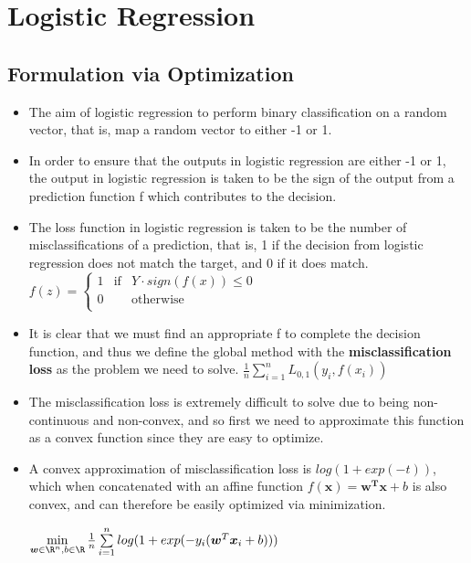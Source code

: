 \documentclass[english]{latex4ei/latex4ei_sheet}
\begin{document}
\section{Logistic Regression}
\begin{sectionbox}
\subsection{Formulation via Optimization}
\begin{itemize}
\item The aim of logistic regression to perform binary classification on a random vector, that is, map a random vector to either -1 or 1.
\item In order to ensure that the outputs in logistic regression are either -1 or 1, the output in logistic regression is taken to be the sign of the output from a prediction function f which contributes to the decision.
\item The loss function in logistic regression is taken to be the number of misclassifications of a prediction, that is, 1 if the decision from logistic regression does not match the target, and 0 if it does match.
$f(z) = \left\{ \begin{array}{rcl}
     1 & \mbox{if}
& Y\cdot sign(f(x))\leq 0 \\ 0 & & \mbox{otherwise}\\
\end{array}\right.$
\item It is clear that we must find an appropriate f  to complete the decision function, and thus we define the global method with the \textbf{misclassification loss} as the problem we need to solve.
$ \frac{1}{n}\sum\limits_{i=1}^nL_{0,1}(y_i,f(x_i))$
\item The misclassification loss is extremely difficult to solve due to being non-continuous and non-convex, and so first we need to approximate this function as a convex function since they are easy to optimize.
\item A convex approximation of misclassification loss is $log(1 + exp(-t))$, which when concatenated with  an affine function $f(\boldsymbol{x})=\boldsymbol{w^Tx}+b$ is also convex, and can therefore be easily optimized via minimization.\\
\begin{center}
\begin{emphbox}
    $\min\limits_{\boldsymbol{w}\in\R^n,b\in\R}\frac{1}{n}\sum\limits_{i=1}^nlog(1+exp(-y_i(\boldsymbol{w}^T\boldsymbol{x}_i+b)))$
    \end{emphbox}

\end{center}
\end{itemize}
\end{sectionbox}
\end{document}
